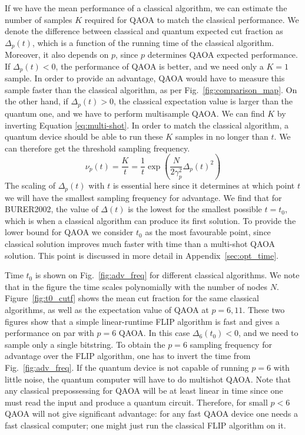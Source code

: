 If we have the mean performance of a classical algorithm, we can estimate the number of samples $K$ required for QAOA to match the classical performance. We denote the difference between classical and quantum expected cut fraction as $\Delta_p(t)$, which is a function of the running time of the classical algorithm. Moreover, it also depends on $p$, since $p$ determines QAOA expected performance. If $\Delta_p(t) < 0$, the performance of QAOA is better, and we  need only a $K=1$ sample. In order to provide an advantage, QAOA would have to measure this sample faster than the classical algorithm, as per Fig.~\ref{fig:comparison_map}. On the other hand, if $\Delta_p(t) > 0$, the classical expectation value is larger than the quantum one, and we have to perform multisample QAOA. We can find $K$ by inverting Equation \ref{eq:multi-shot}. In order to match the classical algorithm, a quantum device should be able to run these $K$ samples in no longer than $t$. We can therefore get the threshold sampling frequency.
\begin{equation}
   \nu_p(t) = \frac{K}{t} = \frac{1}{t}\exp \left({\frac{N}{2\gamma_p^2}\Delta_p(t) ^2} \right)
\end{equation}
The scaling of $\Delta_p(t)$ with $t$ is essential here since it determines at which point $t$ we will have the smallest sampling frequency for advantage. We find that for BURER2002, the value of $\Delta(t)$ is the lowest for the smallest possible $t=t_0$, which is when a classical algorithm can produce its first solution. To provide the lower bound for QAOA we consider $t_0$ as the most favourable point, since classical solution improves much faster with time than a multi-shot QAOA solution. This point is discussed in more detail in Appendix~\ref{sec:opt_time}.

Time $t_0$ is shown on Fig.~\ref{fig:adv_freq} for different classical algorithms. We note that in the figure
the time scales polynomially with the number of nodes $N$. Figure~\ref{fig:t0_cutf} shows the mean cut fraction for the same classical algorithms, as well as the expectation value of QAOA at $p=6, 11$. These two figures show that a simple linear-runtime FLIP algorithm is fast and gives a performance on par with $p=6$ QAOA. In this case $\Delta_6(t_0) < 0$, and we  need to sample only a single bitstring. To obtain the $p=6$ sampling frequency for advantage over the FLIP algorithm, one has to invert the time from Fig.~\ref{fig:adv_freq}. If the quantum device is not capable of running $p=6$ with little noise, the quantum computer will have to do multishot QAOA. Note that any classical prepossessing for QAOA will be at least linear in time since one must read the input and produce a quantum circuit. Therefore, for small $p<6$ QAOA will not give significant advantage: for any fast QAOA device one needs a fast classical computer; one might just run the classical FLIP algorithm on it.

